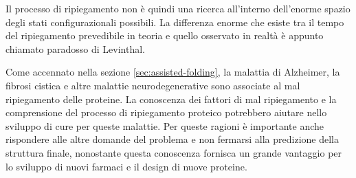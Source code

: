 {\par Il processo di ripiegamento non è quindi una ricerca all'interno dell'enorme spazio degli stati configurazionali possibili. La differenza enorme che esiste tra il tempo del ripiegamento prevedibile in teoria e quello osservato in realtà è appunto chiamato paradosso di Levinthal.

\par Come accennato nella sezione \ref{sec:assisted-folding}, la malattia di Alzheimer, la fibrosi cistica e altre malattie neurodegenerative sono associate al mal ripiegamento delle proteine. La conoscenza dei fattori di mal ripiegamento e la comprensione del processo di ripiegamento proteico potrebbero aiutare nello sviluppo di cure per queste malattie. Per queste ragioni è importante anche rispondere alle altre domande del problema e non fermarsi alla predizione della struttura finale, nonostante questa conoscenza fornisca un grande vantaggio per lo sviluppo di nuovi farmaci e il design di nuove proteine.
}
\clearpage